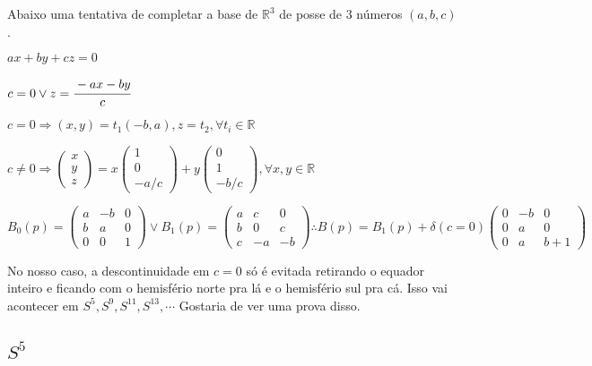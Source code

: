 \documentclass[10pt,a4paper]{article}
\begin{document}
		Abaixo uma tentativa de completar a base de $\mathbb{R}^3$ de posse de 3 n\'umeros $(a,b,c)$.

		$ax + by + cz = 0$

		$c = 0 \vee z = \cfrac{-ax - by}{c}$

		$c = 0 \Rightarrow (x,y) = t_1 (-b, a), z = t_2, \forall t_i \in \mathbb{R}$

		$c \ne 0 \Rightarrow \left( \begin{matrix} x \\ y \\ z \end{matrix} \right) = x \left( \begin{matrix} 1 \\ 0 \\ -a/c \end{matrix} \right) + y \left( \begin{matrix} 0 \\ 1 \\ -b/c \end{matrix} \right), \forall x,y \in \mathbb{R}$

		$B_0(p) = \left( \begin{matrix} a & -b & 0 \\ b & a & 0 \\ 0 & 0 & 1 \end{matrix} \right) \vee B_1(p) = \left( \begin{matrix} a & c & 0 \\ b & 0 & c \\ c & -a & -b \end{matrix} \right) \therefore B(p) = B_1(p) + \delta(c = 0) \left( \begin{matrix} 0 & -b & 0 \\ 0 & a & 0 \\ 0 & a & b + 1 \end{matrix} \right)$

		No nosso caso, a descontinuidade em $c = 0$ s\'o \'e evitada retirando o equador inteiro e ficando com o hemisf\'erio norte pra l\'a e o hemisf\'erio sul pra c\'a. Isso vai acontecer em $S^5, S^9, S^{11}, S^{13}, \cdots$ Gostaria de ver uma prova disso.

		\subsection{$S^5$}
		\begin{flushright}
		\end{flushright}
\end{document}

